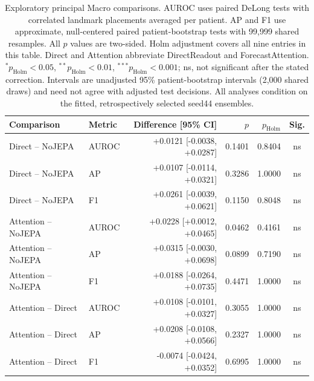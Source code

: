 \begin{table}[t]
\centering
\small
\caption{Exploratory principal Macro comparisons. AUROC uses paired DeLong tests with correlated landmark placements averaged per patient. AP and F1 use approximate, null-centered paired patient-bootstrap tests with 99,999 shared resamples. All $p$ values are two-sided. Holm adjustment covers all nine entries in this table. Direct and Attention abbreviate DirectReadout and ForecastAttention. $^{*}p_{\mathrm{Holm}}<0.05$, $^{**}p_{\mathrm{Holm}}<0.01$, $^{***}p_{\mathrm{Holm}}<0.001$; ns, not significant after the stated correction. Intervals are unadjusted 95\% patient-bootstrap intervals (2,000 shared draws) and need not agree with adjusted test decisions. All analyses condition on the fitted, retrospectively selected seed44 ensembles.}
\label{tab:bootstrap}
\begin{tabular}{llrrrc}
\toprule
Comparison & Metric & Difference [95\% CI] & $p$ & $p_{\mathrm{Holm}}$ & Sig. \\
\midrule
Direct -- NoJEPA & AUROC & +0.0121 [-0.0038, +0.0287] & 0.1401 & 0.8404 & ns \\
Direct -- NoJEPA & AP & +0.0107 [-0.0114, +0.0321] & 0.3286 & 1.0000 & ns \\
Direct -- NoJEPA & F1 & +0.0261 [-0.0039, +0.0621] & 0.1150 & 0.8048 & ns \\
Attention -- NoJEPA & AUROC & +0.0228 [+0.0012, +0.0465] & 0.0462 & 0.4161 & ns \\
Attention -- NoJEPA & AP & +0.0315 [-0.0030, +0.0698] & 0.0899 & 0.7190 & ns \\
Attention -- NoJEPA & F1 & +0.0188 [-0.0264, +0.0735] & 0.4471 & 1.0000 & ns \\
Attention -- Direct & AUROC & +0.0108 [-0.0101, +0.0327] & 0.3055 & 1.0000 & ns \\
Attention -- Direct & AP & +0.0208 [-0.0108, +0.0566] & 0.2327 & 1.0000 & ns \\
Attention -- Direct & F1 & -0.0074 [-0.0424, +0.0352] & 0.6995 & 1.0000 & ns \\
\bottomrule
\end{tabular}
\end{table}
